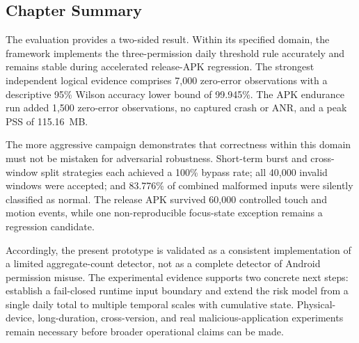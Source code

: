 \subsection{Chapter Summary}

The evaluation provides a two-sided result. Within its specified domain, the framework implements the three-permission daily threshold rule accurately and remains stable during accelerated release-APK regression. The strongest independent logical evidence comprises 7,000 zero-error observations with a descriptive 95\% Wilson accuracy lower bound of 99.945\%. The APK endurance run added 1,500 zero-error observations, no captured crash or ANR, and a peak PSS of 115.16~MB.

The more aggressive campaign demonstrates that correctness within this domain must not be mistaken for adversarial robustness. Short-term burst and cross-window split strategies each achieved a 100\% bypass rate; all 40,000 invalid windows were accepted; and 83.776\% of combined malformed inputs were silently classified as normal. The release APK survived 60,000 controlled touch and motion events, while one non-reproducible focus-state exception remains a regression candidate.

Accordingly, the present prototype is validated as a consistent implementation of a limited aggregate-count detector, not as a complete detector of Android permission misuse. The experimental evidence supports two concrete next steps: establish a fail-closed runtime input boundary and extend the risk model from a single daily total to multiple temporal scales with cumulative state. Physical-device, long-duration, cross-version, and real malicious-application experiments remain necessary before broader operational claims can be made.
